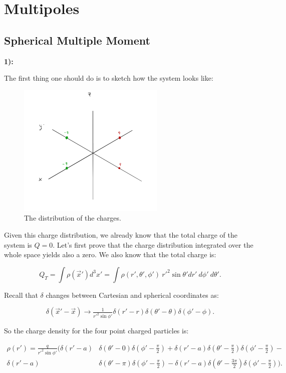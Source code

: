 \section{Multipoles}

\subsection{Spherical Multiple Moment}\label{Spherical Multiple Moment}

\textbf{1):}

The first thing one should do is to sketch how the system looks like:

\begin{figure}[h]
	\includegraphics[width=7cm]{figures/Quadrupole.png}
	\centering
	\caption{The distribution of the charges.}
\end{figure}

Given this charge distribution, we already know that the total charge of the system is $Q=0$. Let's first prove that the charge distribution integrated over the whole space yields also a zero. We also know that the total charge is:
	
\begin{equation}
	Q_{T} = \int \rho (\vec{x}') d^{3}x' = \int \rho(r', \theta', \phi')\: r'^{2} \sin\theta' dr' \: d\phi' \: d\theta'.
\end{equation}

Recall that $\delta$ changes between Cartesian and spherical coordinates as:

\begin{equation}
	\delta (\vec{x}' - \vec{x}) \rightarrow \tfrac{1}{r'^{2} \sin \phi'} \delta (r' -r) \delta(\theta' -\theta) \delta (\phi' - \phi).
\end{equation}

So the charge density for the four point charged particles is:

\begin{equation}
	\begin{split}
		\rho (r') = \tfrac{q}{r'^{2} \sin\phi'} (\delta (r' -a) &\delta(\theta' - 0) \delta (\phi' - \tfrac{\pi}{2}) + \delta (r' -a) \delta(\theta' - \tfrac{\pi}{2}) \delta (\phi' - \tfrac{\pi}{2})-\\
		\delta (r' -a) &\delta(\theta' - \pi) \delta (\phi' - \tfrac{\pi}{2}) -\delta (r' -a) \delta(\theta' - \tfrac{3\pi}{2}) \delta (\phi' - \tfrac{\pi}{2})).
	\end{split}
\end{equation}

